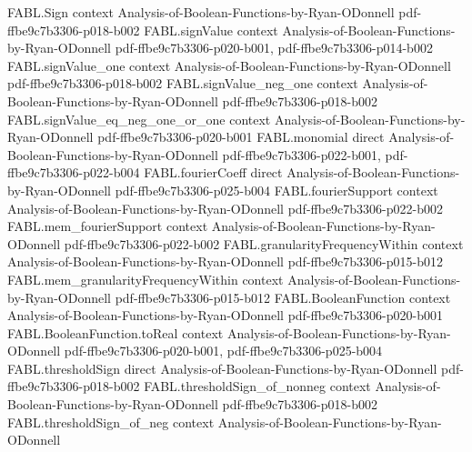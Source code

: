 \begin{theorem}
\label{FABL.mul_sum_signValue_le_majority}
\leanok
{}
\proofstep
  {FABL.Sign}
  {context}
  {Analysis-of-Boolean-Functions-by-Ryan-ODonnell}
  {pdf-ffbe9c7b3306-p018-b002}
\proofstep
  {FABL.signValue}
  {context}
  {Analysis-of-Boolean-Functions-by-Ryan-ODonnell}
  {pdf-ffbe9c7b3306-p020-b001,
    pdf-ffbe9c7b3306-p014-b002}
\proofstep
  {FABL.signValue_one}
  {context}
  {Analysis-of-Boolean-Functions-by-Ryan-ODonnell}
  {pdf-ffbe9c7b3306-p018-b002}
\proofstep
  {FABL.signValue_neg_one}
  {context}
  {Analysis-of-Boolean-Functions-by-Ryan-ODonnell}
  {pdf-ffbe9c7b3306-p018-b002}
\proofstep
  {FABL.signValue_eq_neg_one_or_one}
  {context}
  {Analysis-of-Boolean-Functions-by-Ryan-ODonnell}
  {pdf-ffbe9c7b3306-p020-b001}
\proofstep
  {FABL.monomial}
  {direct}
  {Analysis-of-Boolean-Functions-by-Ryan-ODonnell}
  {pdf-ffbe9c7b3306-p022-b001,
    pdf-ffbe9c7b3306-p022-b004}
\proofstep
  {FABL.fourierCoeff}
  {direct}
  {Analysis-of-Boolean-Functions-by-Ryan-ODonnell}
  {pdf-ffbe9c7b3306-p025-b004}
\proofstep
  {FABL.fourierSupport}
  {context}
  {Analysis-of-Boolean-Functions-by-Ryan-ODonnell}
  {pdf-ffbe9c7b3306-p022-b002}
\proofstep
  {FABL.mem_fourierSupport}
  {context}
  {Analysis-of-Boolean-Functions-by-Ryan-ODonnell}
  {pdf-ffbe9c7b3306-p022-b002}
\proofstep
  {FABL.granularityFrequencyWithin}
  {context}
  {Analysis-of-Boolean-Functions-by-Ryan-ODonnell}
  {pdf-ffbe9c7b3306-p015-b012}
\proofstep
  {FABL.mem_granularityFrequencyWithin}
  {context}
  {Analysis-of-Boolean-Functions-by-Ryan-ODonnell}
  {pdf-ffbe9c7b3306-p015-b012}
\proofstep
  {FABL.BooleanFunction}
  {context}
  {Analysis-of-Boolean-Functions-by-Ryan-ODonnell}
  {pdf-ffbe9c7b3306-p020-b001}
\proofstep
  {FABL.BooleanFunction.toReal}
  {context}
  {Analysis-of-Boolean-Functions-by-Ryan-ODonnell}
  {pdf-ffbe9c7b3306-p020-b001,
    pdf-ffbe9c7b3306-p025-b004}
\proofstep
  {FABL.thresholdSign}
  {direct}
  {Analysis-of-Boolean-Functions-by-Ryan-ODonnell}
  {pdf-ffbe9c7b3306-p018-b002}
\proofstep
  {FABL.thresholdSign_of_nonneg}
  {context}
  {Analysis-of-Boolean-Functions-by-Ryan-ODonnell}
  {pdf-ffbe9c7b3306-p018-b002}
\proofstep
  {FABL.thresholdSign_of_neg}
  {context}
  {Analysis-of-Boolean-Functions-by-Ryan-ODonnell}

\end{theorem}
